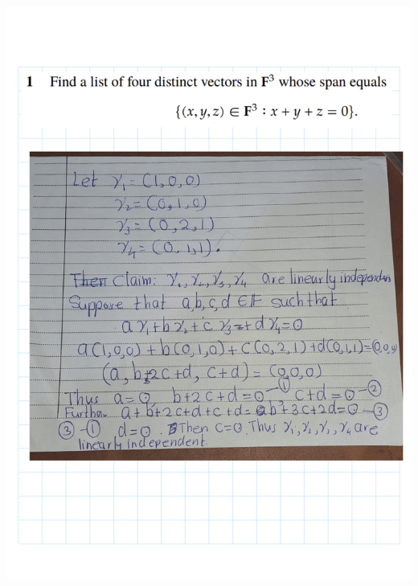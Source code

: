 \documentclass[
]{book}
\theoremstyle{definition}
\theoremstyle{definition}
\theoremstyle{definition}
\theoremstyle{definition}
\theoremstyle{remark}
\begin{document}
\includegraphics{fig/Ex2A/Ex2A-01.png}
\end{document}
